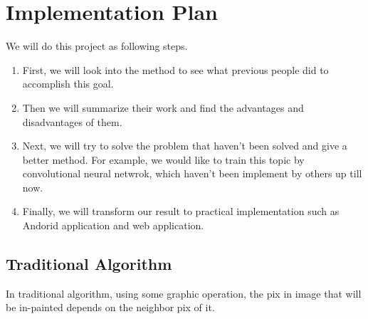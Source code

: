 \documentclass[12pt]{article}
\begin{document}
\section{Implementation Plan}
We will do this project as following steps.
\begin{enumerate}[1.]
	\item First, we will look into the method to see what previous people did to accomplish this goal. 
	\item Then we will summarize their work and find the advantages and disadvantages of them. 
	\item Next, we will try to solve the problem that haven't been solved and give a better method. For example, we would like to train this topic by convolutional neural netwrok, which haven't been implement by others up till now. 
	\item Finally, we will transform our result to practical implementation such as Andorid application and web application.
\end{enumerate}
\subsection{Traditional Algorithm}
\qquad In traditional algorithm, using some graphic operation, the pix in image that will be in-painted depends on the neighbor pix of it. 
\end{document}
